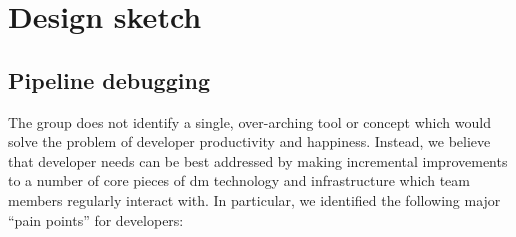 \section{Design sketch}
\label{sec:design}

\subsection{Pipeline debugging}
\label{sec:design:debug}


The group does not identify a single, over-arching tool or concept which would
solve the problem of developer productivity and happiness. Instead, we believe
that developer needs can be best addressed by making incremental improvements
to a number of core pieces of \gls{dm} technology and infrastructure which
team members regularly interact with. In particular, we identified the
following major ``pain points'' for developers:

